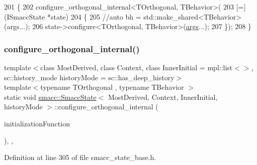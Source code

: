 \begin{DoxyCode}
201     \{
202     configure\_orthogonal\_internal<TOrthogonal, TBehavior>(
203       [=](ISmaccState *state) 
204       \{
205         \textcolor{comment}{//auto bh = std::make\_shared<TBehavior>(args...);}
206         state->configure<TOrthogonal, TBehavior>(\hyperlink{namespacegenerate__debs_a75f9143e38df82d83b2e8a6f99cae02c}{args}...);
207       \});
208     \}
\end{DoxyCode}
\mbox{\label{classsmacc_1_1SmaccState_a1656e6a5fd9ec036267a740a00260bf3}} 
\subsubsection{\texorpdfstring{configure\+\_\+orthogonal\+\_\+internal()}{configure\_orthogonal\_internal()}}
{\footnotesize\ttfamily template$<$class Most\+Derived, class Context, class Inner\+Initial = mpl\+::list$<$$>$, sc\+::history\+\_\+mode history\+Mode = sc\+::has\+\_\+deep\+\_\+history$>$ \\
template$<$typename T\+Orthogonal , typename T\+Behavior $>$ \\
static void \hyperlink{classsmacc_1_1SmaccState}{smacc\+::\+Smacc\+State}$<$ Most\+Derived, Context, Inner\+Initial, history\+Mode $>$\+::configure\+\_\+orthogonal\+\_\+internal (\begin{DoxyParamCaption}\item[{std\+::function$<$ void(\hyperlink{classsmacc_1_1ISmaccState}{I\+Smacc\+State}$<$ Most\+Derived, Context, Inner\+Initial, history\+Mode $>$ $\ast$state)$>$}]{initialization\+Function }\end{DoxyParamCaption})\hspace{0.3cm}{\ttfamily [inline]}, {\ttfamily [static]}, {\ttfamily [private]}}



Definition at line 305 of file smacc\+\_\+state\+\_\+base.\+h.


